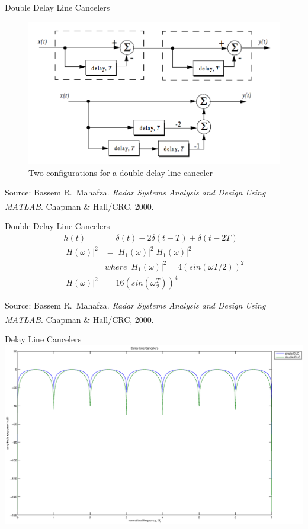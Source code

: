 \documentclass[mathserif]{beamer}
\begin{document}
    
    \begin{frame}{Double Delay Line Cancelers}
	\begin{figure}[h]
		\centering
		\includegraphics[width=\linewidth]{doubleDLC} 
		\caption{Two configurations for a double delay line canceler}
	\end{figure}
    	\tiny{Source: Bassem R.~Mahafza. \emph{Radar Systems Analysis and Design Using MATLAB\textsuperscript{\textregistered}}. Chapman \& Hall/CRC, 2000.}

    \end{frame}
    
    
    \begin{frame}{Double Delay Line Cancelers}
      \begin{align}
       h(t) & = \delta(t) - 2\delta(t-T) + \delta(t-2T) \nonumber \\
       |H(\omega)|^2 & = |H_1(\omega)|^2|H_1(\omega)|^2 \nonumber \\
       & where~ |H_1(\omega)|^2 = 4(sin(\omega T/2))^2 \nonumber \\
       |H(\omega)|^2 & = 16\left(sin\left(\omega\frac{T}{2}\right)\right)^4 \nonumber
      \end{align}

      \vfill
    	\tiny{Source: Bassem R.~Mahafza. \emph{Radar Systems Analysis and Design Using MATLAB\textsuperscript{\textregistered}}. Chapman \& Hall/CRC, 2000.}

    \end{frame}



    \begin{frame}{Delay Line Cancelers}
    	\includegraphics[width=\linewidth]{delayLineCancelers}
    \end{frame}
    
\end{document}
